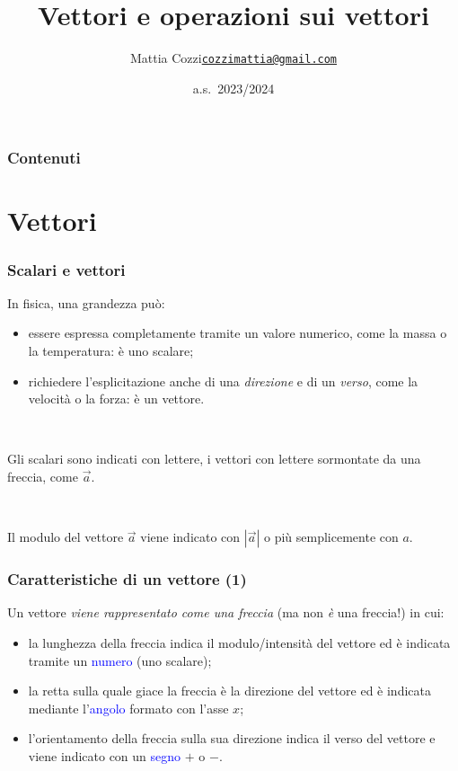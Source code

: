 \documentclass[]{beamer}
\title{Vettori e operazioni sui vettori}
\author{\texorpdfstring{Mattia Cozzi\newline\href{mailto:cozzimattia@gmail.com}{\texttt{cozzimattia@gmail.com}}}{Mattia Cozzi}}
\date{a.s.~2023/2024}
\begin{document}
\begin{frame}
  \titlepage
\end{frame}





\begin{frame}
\frametitle{Contenuti}
\tableofcontents
\end{frame}


\section{Vettori}


\begin{frame}
  \frametitle{Scalari e vettori}
  In fisica, una grandezza può:
\begin{itemize}
  \item essere espressa completamente tramite un valore numerico, come la massa o la temperatura: è uno \alert<1,3>{scalare};\pause
  \item richiedere l'esplicitazione anche di una \emph{direzione} e di un \emph{verso}, come la velocità o la forza: è un \alert<2-3>{vettore}.\pause
\end{itemize}

~

  Gli scalari sono indicati con lettere, i vettori con lettere sormontate da una freccia, come $ \vec{a} $.\pause
  
  ~
  
  Il modulo del vettore $ \vec{a} $ viene indicato con $ |\vec{a}| $ o più semplicemente con $ a $.
\end{frame}

\begin{frame}
\frametitle{Caratteristiche di un vettore (1)}
  Un vettore \emph{viene rappresentato come una freccia} (ma non \emph{è} una freccia!) in cui:
  \begin{itemize}
    \item la lunghezza della freccia indica il \alert{modulo/intensità} del vettore ed è indicata tramite un \textcolor{blue}{numero} (uno scalare);\pause
    \item la retta sulla quale giace la freccia è la \alert{direzione} del vettore ed è indicata mediante l'\textcolor{blue}{angolo} formato con l'asse $ x $;\pause
    \item l'orientamento della freccia sulla sua direzione indica il \alert{verso} del vettore e viene indicato con un \textcolor{blue}{segno} $ + $ o $ - $. 
  \end{itemize}
\end{frame}
\end{document}

